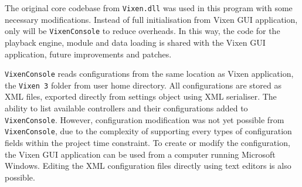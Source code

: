 

The original core codebase from \texttt{Vixen.dll} was used in this program with some necessary modifications. Instead of full initialisation from Vixen GUI application, only  will be  \texttt{VixenConsole} to reduce overheads. In this way, the code for the playback engine, module and data loading is  shared with the Vixen GUI application,  future improvements and patches.

\texttt{VixenConsole} reads configurations from the same location as Vixen application, the \texttt{Vixen 3} folder from user home directory. All configurations are stored as XML files, exported directly from settings object using XML serialiser. The ability to list available controllers and their configurations  added to \texttt{VixenConsole}. However, configuration modification was not yet possible from \texttt{VixenConsole}, due to the complexity of supporting every  types of configuration fields within the project time constraint. To create or modify the configuration, the Vixen GUI application can be used from a computer running Microsoft Windows. Editing the XML configuration files directly using text editors is also possible.



